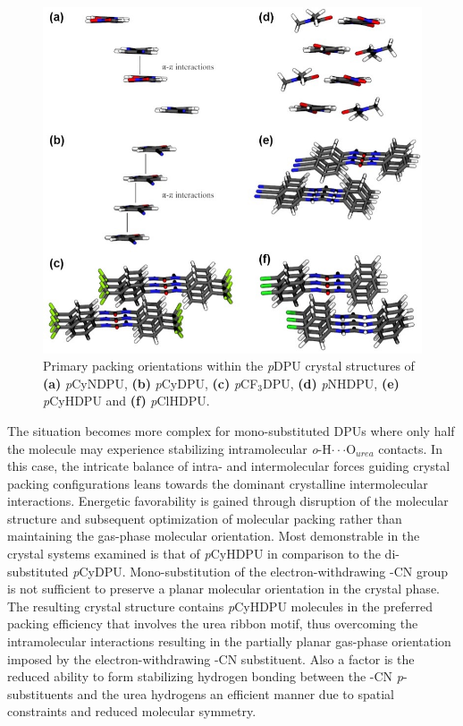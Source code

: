 \begin{figure}[h!]
    \centering
    \includegraphics[width=0.8\linewidth]{figures/pub3/Picture4.jpg}
    \caption{Primary packing orientations within the \textit{p}DPU crystal structures of \textbf{\textbf{(a)}} \textit{p}CyNDPU, \textbf{(b)} \textit{p}CyDPU, \textbf{(c)} \textit{p}CF$_{3}$DPU, \textbf{(d)} \textit{p}NHDPU, \textbf{(e)} \textit{p}CyHDPU and \textbf{(f)} \textit{p}ClHDPU.}\label{fig:packing}
\end{figure}

The situation becomes more complex for mono-substituted DPUs where only half the molecule may experience stabilizing intramolecular \textit{o}-H$\cdot \cdot \cdot$O$_{urea}$ contacts. In this case, the intricate balance of intra- and intermolecular forces guiding crystal packing configurations leans towards the dominant crystalline intermolecular interactions. Energetic favorability is gained through disruption of the molecular structure and subsequent optimization of molecular packing rather than maintaining the gas-phase molecular orientation. Most demonstrable in the crystal systems examined is that of \textit{p}CyHDPU in comparison to the di-substituted \textit{p}CyDPU. Mono-substitution of the electron-withdrawing -CN group is not sufficient to preserve a planar molecular orientation in the crystal phase. The resulting crystal structure contains \textit{p}CyHDPU molecules in the preferred packing efficiency that involves the urea ribbon motif, thus overcoming the intramolecular interactions resulting in the partially planar gas-phase orientation imposed by the electron-withdrawing -CN substituent. Also a factor is the reduced ability to form stabilizing hydrogen bonding between the -CN \textit{p}-substituents and the urea hydrogens an efficient manner due to spatial constraints and reduced molecular symmetry.

